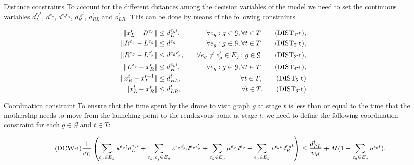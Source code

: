 \documentclass[slidestop,usepdftitle=false,10pt]{beamer}
\begin{document}
	\begin{frame}{Distance constraints}
	    To account for the different distances among the decision variables of the model we need to set the continuous variables $d_L^{e_gt}$, $d^{e_g}$, $d^{e_ge^\prime_g}$, $d_R^{e_gt}$, $d_{RL}^t$ and $d_{LR}^t$. This can be done by means of the following constraints:
        
        \begin{align*}
        \|x_L^t- R^{e_g}\| & \leq  d_L^{e_gt},  &\quad \forall e_g:g\in \mathcal{G}, \forall t\in T \tag{DIST$_{1}$-t}, \label{eq:d1}\\
        \|R^{e_g}- L^{e_g}\| & \leq  d^{e_g},  &\quad \forall e_g:g\in \mathcal{G},\forall t\in T \tag{DIST$_{2}$-t}, \label{eq:d2}\\
        \|R^{e_g}- L^{e^\prime_g}\| & \leq  d^{e_ge^\prime_g}, &\quad \forall e_g\neq e_g'\in E_g:g\in \mathcal{G} \tag{DIST$_{3}$-t}, \label{eq:d3}\\
        \|L^{e_g}- x_R^t\| & \leq  d_R^{e_gt}, &\quad \forall e_g:g\in \mathcal{G},\forall t\in T \tag{DIST$_{4}$-t}, \label{eq:d4}\\
        \|x_R^t- x_L^{t+1}\| & \leq  d_{RL}^t, & \quad \forall t\in T, \tag{DIST$_{5}$-t} \label{eq:d5}\\
        \|x_L^t- x_R^t\| & \leq  d_{LR}^t, & \quad \forall t\in T. \tag{DIST$_{6}$-t} \label{eq:d6}\\
        \end{align*}
	\end{frame}
	
	\begin{frame}{Coordination constraint}
	    To ensure that the time spent by the drone to visit graph $g$ at stage $t$ is less than or equal to the time that the mothership needs to move from the launching point to the rendezvous point at stage $t$, we need to define the following coordination constraint for each $g\in \mathcal G$ and $t\in T$:

        \begin{equation}\tag{DCW-t}\label{DCW-t}
        \tiny
        \frac{1}{v_D}\left(\sum_{e_g\in E_g} u^{e_gt}d_L^{e_gt} + \sum_{e_g, e^\prime_g\in E_g}z^{e_ge^\prime_g}d^{e_ge^\prime_g} + \sum_{e_g\in E_g} \mu^{e_g}d^{e_g} + \sum_{e_g\in E_g} v^{e_gt}d_R^{e_gt}\right) \leq \frac{d_{RL}^t}{v_M} + M(1 - \sum_{e_g\in E_g} u^{e_gt}).
        \end{equation}
	\end{frame}
	
\end{document}
